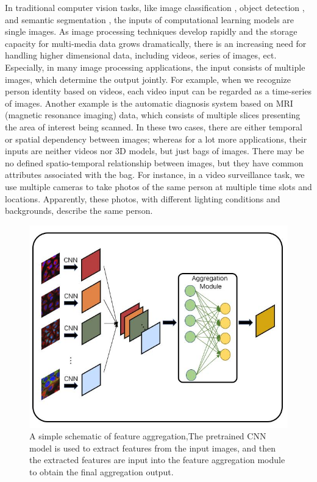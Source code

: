 \documentclass[10pt,twocolumn,letterpaper]{article}
\begin{document}
In traditional computer vision tasks, like image classification \cite{ref1, ref2, ref3}, object detection \cite{ref4, ref5}, and semantic segmentation \cite{ref6, ref7}, the inputs of computational learning models are single images. As image processing techniques develop rapidly and the storage capacity for multi-media data grows dramatically, there is an increasing need for handling higher dimensional data, including videos, series of images, ect. Especially, in many image processing applications, the input consists of multiple images, which determine the output jointly. For example, when we recognize person identity based on videos, each video input can be regarded as a time-series of images. Another example is the automatic diagnosis system based on MRI (magnetic resonance imaging) data, which consists of multiple slices presenting the area of interest being scanned. In these two cases, there are either temporal or spatial dependency between images; whereas for a lot more applications, their inputs are neither videos nor 3D models, but just bags of images. There may be no defined spatio-temporal relationship between images, but they have common attributes associated with the bag. For instance, in a video surveillance task, we use multiple cameras to take photos of the same person at multiple time slots and locations. Apparently, these photos, with different lighting conditions and backgrounds, describe the same person. 

\begin{figure}[t]
\begin{center}
  \includegraphics[width=0.8\linewidth]{figure1.JPG}
\end{center}
   \caption{A simple schematic of feature aggregation,The pretrained CNN model is used to extract features from the input images, and then the extracted features are input into the feature aggregation module to obtain the final aggregation output. }
\label{fig:long}
\label{fig:onecol}
\end{figure}
\end{document}
